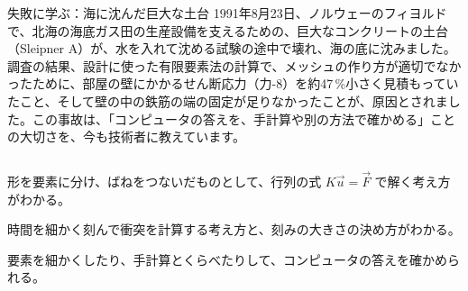 \begin{column}{失敗に学ぶ：海に沈んだ巨大な土台}
1991年8月23日、ノルウェーのフィヨルドで、北海の海底ガス田の生産設備を支えるための、巨大なコンクリートの土台（Sleipner A）が、水を入れて沈める試験の途中で壊れ、海の底に沈みました。調査の結果、設計に使った有限要素法の計算で、メッシュの作り方が適切でなかったために、部屋の壁にかかるせん断応力（力-8）を約47\,\%小さく見積もっていたこと、そして壁の中の鉄筋の端の固定が足りなかったことが、原因とされました。この事故は、「コンピュータの答えを、手計算や別の方法で確かめる」ことの大切さを、今も技術者に教えています。
\end{column}

\begin{furikaeri}
\begin{checklist}
\item 形を要素に分け、ばねをつないだものとして、行列の式 $K\vec u=\vec F$ で解く考え方がわかる。
\item 時間を細かく刻んで衝突を計算する考え方と、刻みの大きさの決め方がわかる。
\item 要素を細かくしたり、手計算とくらべたりして、コンピュータの答えを確かめられる。
\end{checklist}
\end{furikaeri}
